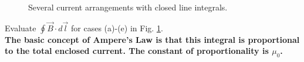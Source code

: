\documentclass[10pt]{article}
\begin{document}
\begin{enumerate}
\begin{enumerate}
\begin{figure}
\caption{\label{fig:amplaw} Several current arrangements with closed line integrals.}
\end{figure}
Evaluate $\oint \vec{B} \cdot d\vec{l}$ for cases (a)-(e) in Fig. \ref{fig:amplaw}. \\ \textbf{The basic concept of Ampere's Law is that this integral is proportional to the total enclosed current.  The constant of proportionality is $\mu_0$.}
\end{enumerate}
\end{enumerate}
\end{document}
